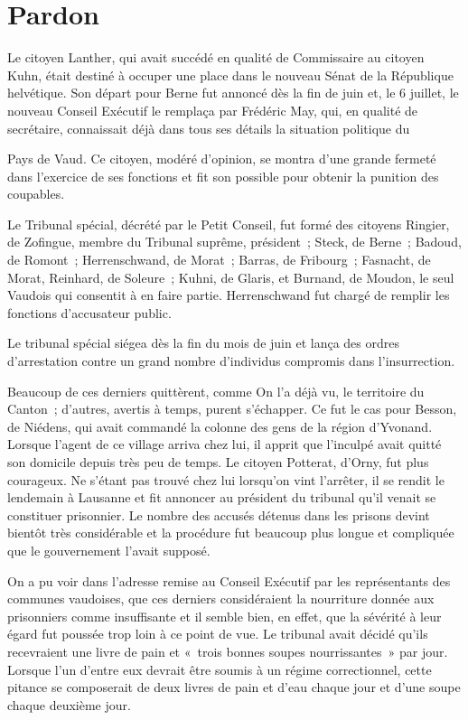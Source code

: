 \documentclass[french,twoside]{book} %
\begin{document}
\section[Pardon]{Pardon}
\noindent Le citoyen Lanther, qui avait succédé en qualité de Commissaire au citoyen Kuhn, était destiné à occuper une place dans le nouveau Sénat de la République helvétique. Son départ pour Berne fut annoncé dès la fin de juin et, le 6 juillet, le nouveau Conseil Exécutif le remplaça par Frédéric May, qui, en qualité de secrétaire, connaissait déjà dans tous ses détails la situation politique du\par
Pays de Vaud. Ce citoyen, modéré d’opinion, se montra d’une grande fermeté dans l’exercice de ses fonctions et fit son possible pour obtenir la punition des coupables.\par
Le Tribunal spécial, décrété par le Petit Conseil, fut formé des citoyens Ringier, de Zofingue, membre du Tribunal suprême, président ; Steck, de Berne ; Badoud, de Romont ; Herrenschwand, de Morat ; Barras, de Fribourg ; Fasnacht, de Morat, Reinhard, de Soleure ; Kuhni, de Glaris, et Burnand, de Moudon, le seul Vaudois qui consentit à en faire partie. Herrenschwand fut chargé de remplir les fonctions d’accusateur public.\par
Le tribunal spécial siégea dès la fin du mois de juin et lança des ordres d’arrestation contre un grand nombre d’individus compromis dans l’insurrection.\par
Beaucoup de ces derniers quittèrent, comme On l’a déjà vu, le territoire du Canton ; d’autres, avertis à temps, purent s’échapper. Ce fut le cas pour Besson, de Niédens, qui avait commandé la colonne des gens de la région d’Yvonand. Lorsque l’agent de ce village arriva chez lui, il apprit que l’inculpé avait quitté son domicile depuis très peu de temps. Le citoyen Potterat, d’Orny, fut plus courageux. Ne s’étant pas trouvé chez lui lorsqu’on vint l’arrêter, il se rendit le lendemain à Lausanne et fit annoncer au président du tribunal qu’il venait se constituer prisonnier. Le nombre des accusés détenus dans les prisons devint bientôt très considérable et la procédure fut beaucoup plus longue et compliquée que le gouvernement l’avait supposé.\par
On a pu voir dans l’adresse remise au Conseil Exécutif par les représentants des communes vaudoises, que ces derniers considéraient la nourriture donnée aux prisonniers comme insuffisante et il semble bien, en effet, que la sévérité à leur égard fut poussée trop loin à ce point de vue. Le tribunal avait décidé qu’ils recevraient une livre de pain et « trois bonnes soupes nourrissantes » par jour. Lorsque l’un d’entre eux devrait être soumis à un régime correctionnel, cette pitance se composerait de deux livres de pain et d’eau chaque jour et d’une soupe chaque deuxième jour.\par
\end{document}
